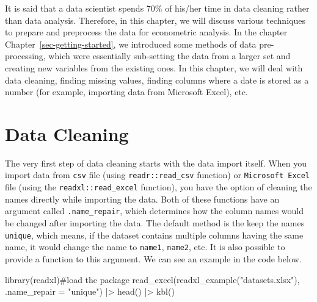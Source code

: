 \documentclass[
  letterpaper,
  paper =a4,
  twoside,
  openright,
  headsepline,
  footsepline,
  listof = totocnumbered,
  chapterprefix = true,
  firstiscover,
  parskip = full*]{scrbook}
\newenvironment{Shaded}{\begin{snugshade}}{\end{snugshade}}
\newcommand{\AttributeTok}[1]{\textcolor[rgb]{0.40,0.45,0.13}{#1}}
\newcommand{\CommentTok}[1]{\textcolor[rgb]{0.37,0.37,0.37}{#1}}
\newcommand{\FunctionTok}[1]{\textcolor[rgb]{0.28,0.35,0.67}{#1}}
\newcommand{\NormalTok}[1]{\textcolor[rgb]{0.00,0.23,0.31}{#1}}
\newcommand{\SpecialCharTok}[1]{\textcolor[rgb]{0.37,0.37,0.37}{#1}}
\newcommand{\StringTok}[1]{\textcolor[rgb]{0.13,0.47,0.30}{#1}}
\begin{document}
It is said that a data scientist spends 70\% of his/her time in data
cleaning rather than data analysis. Therefore, in this chapter, we will
discuss various techniques to prepare and preprocess the data for
econometric analysis. In the chapter Chapter~\ref{sec-getting-started},
we introduced some methods of data pre-processing, which were
essentially sub-setting the data from a larger set and creating new
variables from the existing ones. In this chapter, we will deal with
data cleaning, finding missing values, finding columns where a date is
stored as a number (for example, importing data from Microsoft Excel),
etc.

\section{Data Cleaning}\label{data-cleaning}

The very first step of data cleaning starts with the data import itself.
When you import data from \texttt{csv} file (using
\texttt{readr::read\_csv} function) or \texttt{Microsoft\ Excel} file
(using the \texttt{readxl::read\_excel} function), you have the option
of cleaning the names directly while importing the data. Both of these
functions have an argument called \texttt{.name\_repair}, which
determines how the column names would be changed after importing the
data. The default method is the keep the names \texttt{unique}, which
means, if the dataset contains multiple columns having the same name, it
would change the name to \texttt{name1}, \texttt{name2}, etc. It is also
possible to provide a function to this argument. We can see an example
in the code below.

\begin{Shaded}
\begin{Highlighting}[]
\FunctionTok{library}\NormalTok{(readxl)}\CommentTok{\#load the package}
\FunctionTok{read\_excel}\NormalTok{(}\FunctionTok{readxl\_example}\NormalTok{(}\StringTok{"datasets.xlsx"}\NormalTok{), }\AttributeTok{.name\_repair =} \StringTok{"unique"}\NormalTok{) }\SpecialCharTok{|\textgreater{}} \FunctionTok{head}\NormalTok{() }\SpecialCharTok{|\textgreater{}} 
  \FunctionTok{kbl}\NormalTok{()}
\end{Highlighting}
\end{Shaded}
\end{document}

